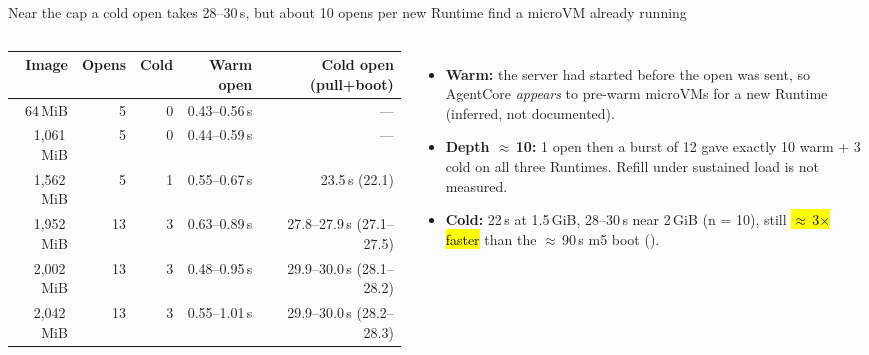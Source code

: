 \begin{frame}{Near the cap a cold open takes 28--30\,s, but about 10 opens per new Runtime find a microVM already running}
\begin{columns}[T]
\scriptsize\setlength{\tabcolsep}{4pt}
\begin{tabular}{@{}rrrrr@{}}
\toprule
\textbf{Image} & \textbf{Opens} & \textbf{Cold} & \textbf{Warm open} & \textbf{Cold open (pull+boot)}\\
\midrule
64\,MiB & 5 & 0 & 0.43--0.56\,s & ---\\
1,061\,MiB & 5 & 0 & 0.44--0.59\,s & ---\\
1,562\,MiB & 5 & 1 & 0.55--0.67\,s & 23.5\,s (22.1)\\
1,952\,MiB & 13 & 3 & 0.63--0.89\,s & 27.8--27.9\,s (27.1--27.5)\\
2,002\,MiB & 13 & 3 & 0.48--0.95\,s & 29.9--30.0\,s (28.1--28.2)\\
2,042\,MiB & 13 & 3 & 0.55--1.01\,s & 29.9--30.0\,s (28.2--28.3)\\
\bottomrule
\end{tabular}
\begin{itemize}\footnotesize\setlength{\itemsep}{1.5mm}
\item \textbf{Warm:} the server had started before the open was sent, so AgentCore \emph{appears} to pre-warm microVMs for a new Runtime (inferred, not documented).
\item \textbf{Depth $\approx$\,10:} 1 open then a burst of 12 gave exactly 10 warm + 3 cold on all three Runtimes. Refill under sustained load is not measured.
\item \textbf{Cold:} 22\,s at 1.5\,GiB, 28--30\,s near 2\,GiB (n = 10), still \hl{$\approx$\,3$\times$ faster} than the $\approx$\,90\,s m5 boot ().
\end{itemize}
\end{columns}
\end{frame}

